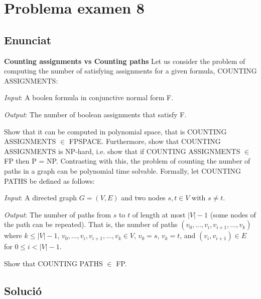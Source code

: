 \section{Problema examen 8}
\subsection{Enunciat}
\textbf{Counting assignments vs Counting paths} Let us consider the problem of computing the number of satisfying assignments for a given formula, COUNTING ASSIGNMENTS:

\vspace{5mm}
\textit{Input}: A boolen formula in conjunctive normal form F. 

\textit{Output}: The number of boolean assignments that satisfy F.

\vspace{5mm}
Show that it can be computed in polynomial space, that is COUNTING ASSIGNMENTS $\in$ FPSPACE. Furthermore, show that COUNTING ASSIGNMENTS is NP-hard, i.e. show that if COUNTING ASSIGNMENTS $\in$ FP then P = NP. Contrasting with this, the problem of counting the number of paths in a graph can be polynomial time solvable. Formally, let COUNTING PATHS be defined as follows: 

\vspace{5mm}
\textit{Input}: A directed graph $G = (V,E)$ and two nodes $s,t \in V$ with $s \neq t$. 

\textit{Output}: The number of paths from $s$ to $t$ of length at most $|V|-1$ (some nodes of the path can be repeated). That is, the number of paths $(v_0,...,v_i,v_{i+1},...,v_k)$ where $k \leq |V|-1$, $v_0,...,v_i,v_{i+1},...,v_k \in V$, $v_0 = s$, $v_k = t$, and $(v_i,v_{i+1}) \in E$ for $0 \leq i < |V|-1$. 

\vspace{5mm}
Show that COUNTING PATHS $\in$ FP.

\subsection{Solució}